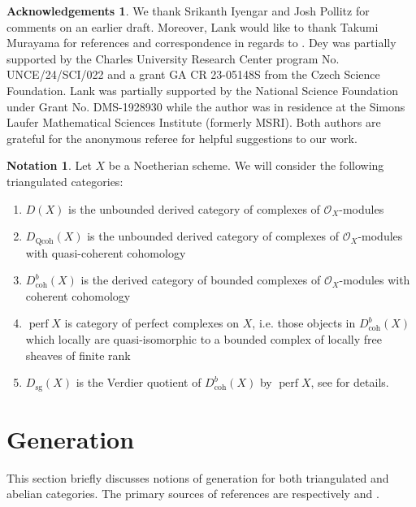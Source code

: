 \documentclass[11pt]{amsart}
\theoremstyle{plain}
\theoremstyle{definition}
\newtheorem{notation}[theorem]{Notation}
\newtheorem*{ack}{Acknowledgements}
\numberwithin{equation}{section}
\numberwithin{theorem}{section}
\begin{document}
\begin{ack}
    We thank Srikanth Iyengar and Josh Pollitz for comments on an earlier draft.
    Moreover, Lank would like to thank Takumi Murayama for
    references and correspondence in regards to . Dey was partially supported by the Charles
    University Research Center program No. UNCE/24/SCI/022 and a grant GA CR
    23-05148S from the Czech Science Foundation. Lank was partially supported by the National Science Foundation under Grant No. DMS-1928930 while the author was in residence at the Simons Laufer Mathematical Sciences Institute (formerly MSRI). Both authors are grateful for the anonymous referee for helpful suggestions to our work.
\end{ack}

\begin{notation}
    Let $X$ be a Noetherian scheme. We will consider the following triangulated categories:
    \begin{enumerate}
        \item $D(X)$ is the unbounded derived category of complexes of $\mathcal{O}_X$-modules
        \item $D_{\operatorname{Qcoh}}(X)$ is the unbounded derived category of complexes of $\mathcal{O}_X$-modules with quasi-coherent cohomology
        \item $D^b_{\operatorname{coh}}(X)$ is the derived category of bounded complexes of $\mathcal{O}_X$-modules with coherent cohomology
        \item $\operatorname{perf}X$ is category of perfect complexes on $X$, i.e. those objects in $D^b_{\operatorname{coh}}(X)$ which locally are quasi-isomorphic to a bounded complex of locally free sheaves of finite rank
        \item $D_{\operatorname{sg}}(X)$ is the Verdier quotient of $D^b_{\operatorname{coh}}(X)$ by $\operatorname{perf} X$, see  for details.
    \end{enumerate}
\end{notation}

\section{Generation}
\label{sec:generation}

This section briefly discusses notions of generation for both triangulated and abelian categories. The primary sources of references are respectively \cite{BVdB:2003, Neeman:2021, Rouquier:2008} and \cite{Dao/Takahashi:2014, Dey/Lank/Takahashi:2023, Iyengar/Takahashi:2016}.
\end{document}
